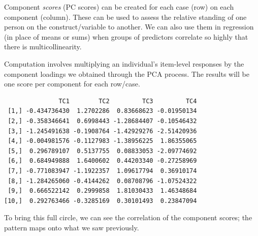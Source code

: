 \documentclass[
  english,
]{book}
\newenvironment{Shaded}{\begin{snugshade}}{\end{snugshade}}
\newcommand{\CommentTok}[1]{\textcolor[rgb]{0.56,0.35,0.01}{\textit{#1}}}
\newcommand{\DataTypeTok}[1]{\textcolor[rgb]{0.13,0.29,0.53}{#1}}
\newcommand{\DecValTok}[1]{\textcolor[rgb]{0.00,0.00,0.81}{#1}}
\newcommand{\KeywordTok}[1]{\textcolor[rgb]{0.13,0.29,0.53}{\textbf{#1}}}
\newcommand{\NormalTok}[1]{#1}
\newcommand{\OperatorTok}[1]{\textcolor[rgb]{0.81,0.36,0.00}{\textbf{#1}}}
\newcommand{\OtherTok}[1]{\textcolor[rgb]{0.56,0.35,0.01}{#1}}
\newcommand{\StringTok}[1]{\textcolor[rgb]{0.31,0.60,0.02}{#1}}
\begin{document}
Component \emph{scores} (PC scores) can be created for each case (row) on each component (column). These can be used to assess the relative standing of one person on the construct/variable to another. We can also use them in regression (in place of means or sums) when groups of predictors correlate so highly that there is multicollinearity.

Computation involves multiplying an individual's item-level responses by the component loadings we obtained through the PCA process. The results will be one score per component for each row/case.

\begin{Shaded}
\end{Shaded}

\begin{verbatim}
               TC1        TC2         TC3         TC4
 [1,] -0.434736430  1.2702286  0.83668623 -0.01950134
 [2,] -0.358346641  0.6998443 -1.28684407 -0.10546432
 [3,] -1.245491638 -0.1908764 -1.42929276 -2.51420936
 [4,] -0.004981576 -0.1127983 -1.38956225  1.86355065
 [5,]  0.296789107  0.5137755  0.08833053 -2.09774692
 [6,]  0.684949888  1.6400602  0.44203340 -0.27258969
 [7,] -0.771083947 -1.1922357  1.09617794  0.36910174
 [8,] -1.284265060 -0.4144262  0.08708796 -1.07524322
 [9,]  0.666522142  0.2999858  1.81030433  1.46348684
[10,]  0.292763466 -0.3285169  0.30101493  0.23847094
\end{verbatim}

\begin{Shaded}
\end{Shaded}

To bring this full circle, we can see the correlation of the component scores; the pattern maps onto what we saw previously.
\end{document}
